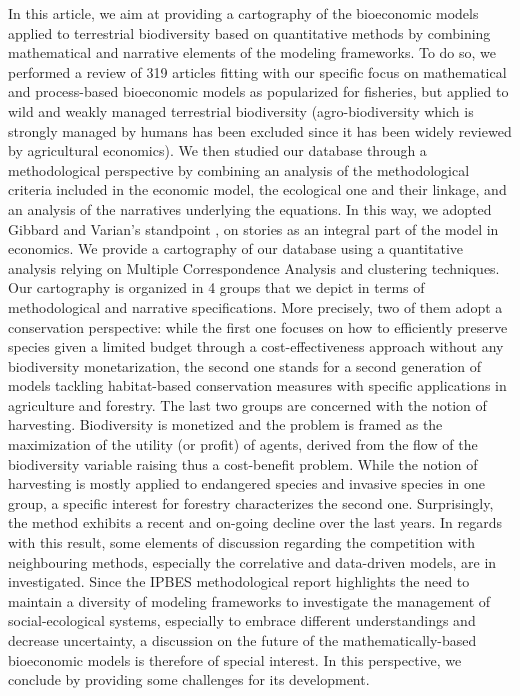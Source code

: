 In this article, we aim at providing a cartography of the bioeconomic models applied to terrestrial biodiversity based on quantitative methods by combining mathematical and narrative elements of the modeling frameworks. To do so, we performed a review of 319 articles fitting with our specific focus on mathematical and process-based bioeconomic models as popularized for fisheries, but applied to wild and weakly managed terrestrial biodiversity (agro-biodiversity which is strongly managed by humans has been excluded since it has been widely reviewed by agricultural economics). We then studied our database through a methodological perspective by combining an analysis of the methodological criteria included in the economic model, the ecological one and their linkage, and an analysis of the narratives underlying the equations. In this way, we adopted  Gibbard and Varian's standpoint \citep{GibbardVarian}, on stories as an integral part of the model in economics. We provide a cartography of our database using a quantitative analysis relying on Multiple Correspondence Analysis and clustering techniques. Our cartography is organized in 4 groups that we depict in terms of methodological and narrative specifications. More precisely, two of them adopt a conservation perspective: while the first one focuses on how to efficiently preserve species given a limited budget through a cost-effectiveness approach without any biodiversity monetarization, the second one stands for a second generation of models tackling habitat-based conservation measures with specific applications in agriculture and forestry. The last two groups are concerned with the notion of harvesting. Biodiversity is  monetized and the problem is framed as the maximization of the 
utility (or profit) of agents, derived from the flow of the biodiversity variable raising thus a cost-benefit problem. While the notion of harvesting is mostly applied to endangered species and invasive species in one group, a specific interest for forestry characterizes the second one. Surprisingly, the method exhibits a recent and on-going decline over the last years. In regards with this result, some elements of discussion regarding the competition with neighbouring methods, especially the correlative and data-driven models, are in investigated. Since the IPBES methodological report \citep{IPBES2016} highlights the need to maintain a diversity of modeling frameworks to investigate the management of social-ecological systems, especially to embrace different understandings and decrease uncertainty, a discussion on the future of the mathematically-based bioeconomic models is therefore of special interest. In this perspective, we conclude by providing some challenges for its development.



